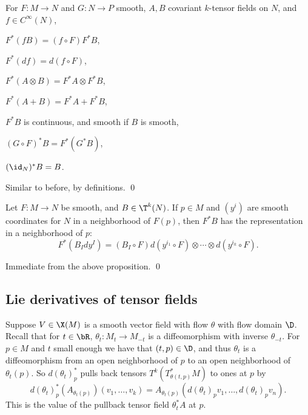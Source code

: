 \edefn

\bprop

    For $F\colon M\to N$ and $G\colon N\to P$ smooth, $A,B$ covariant $k$-tensor fields on $N$, and $f\in C^\infty(N)$,
    \benum
        \item $F^*(fB)=(f\circ F)F^*B$,
        \item $F^*(df)=d(f\circ F)$,
        \item $F^*(A\otimes B)=F^*A\otimes F^*B$,
        \item $F^*(A+B)=F^*A+F^*B$,
        \item $F^*B$ is continuous, and smooth if $B$ is smooth,
        \item $(G\circ F)^*B=F^*(G^*B)$,
        \item $(\id_N)^*B=B$.
    \eenum

\eprop

\bproof

    Similar to before, by definitions.
    \qed

\eproof

\bcoro

    Let $F\colon M\to N$ be smooth, and $B\in\T^k(N)$.
    If $p\in M$ and $(y^i)$ are smooth coordinates for $N$ in a neighborhood of $F(p)$, then $F^*B$ has the representation in a neighborhood of $p$:
    $$ F^*(B_Idy^I) = (B_I\circ F)d(y^{i_1}\circ F)\otimes\cdots\otimes d(y^{i_k}\circ F) . $$

\ecoro

\bproof

    Immediate from the above proposition.
    \qed

\eproof

\subsection{Lie derivatives of tensor fields}

Suppose $V\in\X(M)$ is a smooth vector field with flow $\theta$ with flow domain $\D$.
Recall that for $t\in\bR$, $\theta_t\colon M_t\to M_{-t}$ is a diffeomorphism with inverse $\theta_{-t}$.
For $p\in M$ and $t$ small enough we have that $(t,p)\in\D$, and thus $\theta_t$ is a diffeomorphism from an open neighborhood of $p$ to an
open neighborhood of $\theta_t(p)$.
So $d(\theta_t)_p^*$ pulls back tensors $T^k(T^*_{\theta(t,p)}M)$ to ones at $p$ by
$$ d(\theta_t)^*_p(A_{\theta_t(p)})(v_1,\dots,v_k) = A_{\theta_t(p)}(d(\theta_t)_pv_1,\dots,d(\theta_t)_pv_n) . $$
This is the value of the pullback tensor field $\theta_t^*A$ at $p$.

